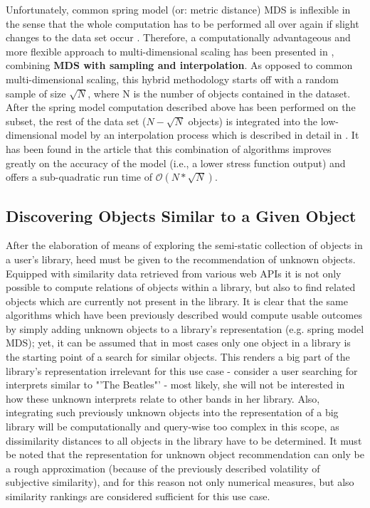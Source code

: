 Unfortunately, common spring model (or: metric distance) MDS is inflexible in the sense that the whole computation has to be performed all over again if slight changes to the data set occur \cite{Morrison:2003:FMS}. 
Therefore, a computationally advantageous and more flexible approach to multi-dimensional scaling has been presented in \cite{Morrison:2003:FMS}, combining \textbf{MDS with sampling and interpolation}. As opposed to common multi-dimensional
scaling, this hybrid methodology starts off with a random sample of size $\sqrt{N}$, where N is the number of objects contained in the dataset. After the spring model computation described above has been performed on the subset, the rest of the data set ($N - \sqrt{N}$ objects) is integrated into the low-dimensional model by an interpolation process which is described in detail in \cite{Morrison:2003:FMS}. It has been found in the article that this combination of algorithms improves greatly on the accuracy of the model (i.e., a lower stress function output) and offers a sub-quadratic run time of $\mathcal O(N*\sqrt{N})$.


\subsection{Discovering Objects Similar to a Given Object}

After the elaboration of means of exploring the semi-static collection of objects in a user's library, heed must be given to the recommendation of unknown objects. Equipped with similarity data retrieved from various web APIs it is not only possible to compute relations of objects within a library, but also to find related objects which are currently not present in the library. It is clear that the same algorithms which have been previously described would compute usable outcomes by simply adding unknown objects to a library's representation (e.g. spring model MDS); yet, it can be assumed that in most cases only one object in a library is the starting point of a search for similar objects. This renders a big part of the library's representation irrelevant for this use case - consider a user searching for interprets similar to "'The Beatles"' - most likely, she will not be interested in how these unknown interprets relate to other bands in her library. Also, integrating such previously unknown objects into the representation of a big library will be computationally and query-wise too complex in this scope, as dissimilarity distances to all objects in the library have to be determined. It must be noted that the representation for unknown object recommendation can only be a rough approximation (because of the previously described volatility of subjective similarity), and for this reason not only numerical measures, but also similarity rankings are considered sufficient for this use case.

